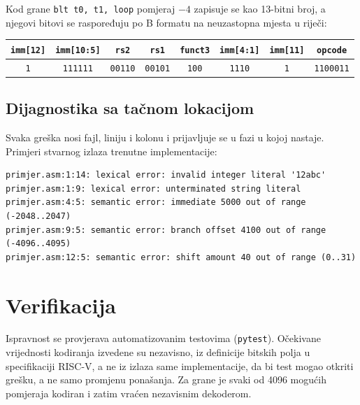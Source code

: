 \documentclass[11pt,a4paper]{article}
\newcommand{\kod}[1]{\texttt{#1}}
\begin{document}
Kod grane \kod{blt t0, t1, loop} pomjeraj $-4$ zapisuje se kao 13-bitni broj, a njegovi bitovi se
raspoređuju po B formatu na neuzastopna mjesta u riječi:

\begin{center}
\small
\begin{tabular}{@{}cccccccc@{}}
  \toprule
  \kod{imm[12]} & \kod{imm[10:5]} & \kod{rs2} & \kod{rs1} & \kod{funct3} & \kod{imm[4:1]} & \kod{imm[11]} & \kod{opcode} \\
  \midrule
  \kod{1} & \kod{111111} & \kod{00110} & \kod{00101} & \kod{100} & \kod{1110} & \kod{1} & \kod{1100011} \\
  \bottomrule
\end{tabular}
\end{center}

\subsection{Dijagnostika sa tačnom lokacijom}

Svaka greška nosi fajl, liniju i kolonu i prijavljuje se u fazi u kojoj nastaje. Primjeri stvarnog
izlaza trenutne implementacije:

\begin{center}
\begin{minipage}{0.92\textwidth}
\small
\begin{verbatim}
primjer.asm:1:14: lexical error: invalid integer literal '12abc'
primjer.asm:1:9: lexical error: unterminated string literal
primjer.asm:4:5: semantic error: immediate 5000 out of range (-2048..2047)
primjer.asm:9:5: semantic error: branch offset 4100 out of range (-4096..4095)
primjer.asm:12:5: semantic error: shift amount 40 out of range (0..31)
\end{verbatim}
\end{minipage}
\end{center}

\section{Verifikacija}

Ispravnost se provjerava automatizovanim testovima (\kod{pytest}). Očekivane vrijednosti
kodiranja izvedene su nezavisno, iz definicije bitskih polja u specifikaciji RISC-V, a ne iz
izlaza same implementacije, da bi test mogao otkriti grešku, a ne samo promjenu ponašanja.
Za grane je svaki od 4096 mogućih pomjeraja kodiran i zatim vraćen nezavisnim dekoderom.
\end{document}
